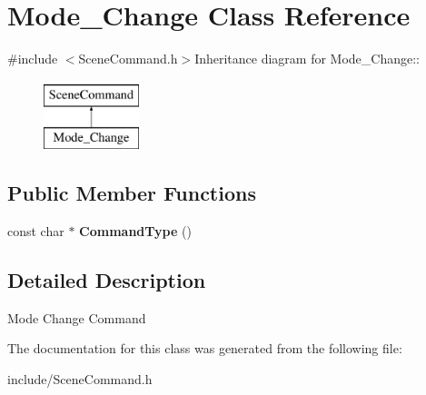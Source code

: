 \hypertarget{class_mode___change}{
\section{Mode\_\-Change Class Reference}
\label{class_mode___change}
}


{\ttfamily \#include $<$SceneCommand.h$>$}Inheritance diagram for Mode\_\-Change::\begin{figure}[H]
\begin{center}
\leavevmode
\includegraphics[height=2cm]{class_mode___change}
\end{center}
\end{figure}
\subsection*{Public Member Functions}
\begin{DoxyCompactItemize}
\item 
\hypertarget{class_mode___change_a749d9011560b9045306f210c10b982d5}{
const char $\ast$ {\bfseries CommandType} ()}
\label{class_mode___change_a749d9011560b9045306f210c10b982d5}

\end{DoxyCompactItemize}


\subsection{Detailed Description}
Mode Change Command 

The documentation for this class was generated from the following file:\begin{DoxyCompactItemize}
\item 
include/SceneCommand.h\end{DoxyCompactItemize}

